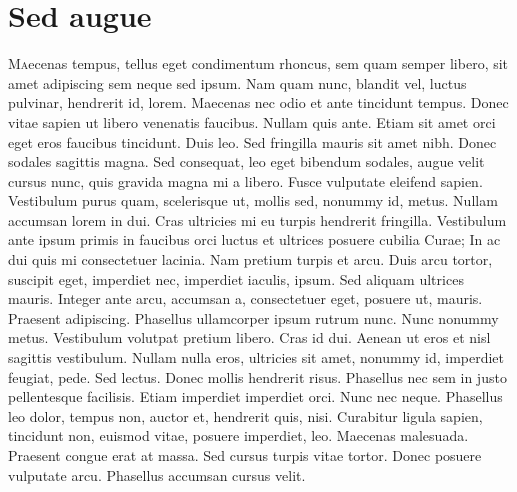 \chapter{Sed augue}
\lettrine[nindent=0em,lines=3]{M} aecenas tempus, tellus eget condimentum rhoncus, sem quam semper libero, sit amet adipiscing sem neque sed ipsum. Nam quam nunc, blandit vel, luctus pulvinar, hendrerit id, lorem. Maecenas nec odio et ante tincidunt tempus. Donec vitae sapien ut libero venenatis faucibus. Nullam quis ante. Etiam sit amet orci eget eros faucibus tincidunt. Duis leo. Sed fringilla mauris sit amet nibh. Donec sodales sagittis magna. Sed consequat, leo eget bibendum sodales, augue velit cursus nunc, quis gravida magna mi a libero. Fusce vulputate eleifend sapien. Vestibulum purus quam, scelerisque ut, mollis sed, nonummy id, metus. Nullam accumsan lorem in dui. Cras ultricies mi eu turpis hendrerit fringilla. Vestibulum ante ipsum primis in faucibus orci luctus et ultrices posuere cubilia Curae; In ac dui quis mi consectetuer lacinia. Nam pretium turpis et arcu. Duis arcu tortor, suscipit eget, imperdiet nec, imperdiet iaculis, ipsum. Sed aliquam ultrices mauris. Integer ante arcu, accumsan a, consectetuer eget, posuere ut, mauris. Praesent adipiscing. Phasellus ullamcorper ipsum rutrum nunc. Nunc nonummy metus. Vestibulum volutpat pretium libero. Cras id dui. Aenean ut eros et nisl sagittis vestibulum. Nullam nulla eros, ultricies sit amet, nonummy id, imperdiet feugiat, pede. Sed lectus. Donec mollis hendrerit risus. Phasellus nec sem in justo pellentesque facilisis. Etiam imperdiet imperdiet orci. Nunc nec neque. Phasellus leo dolor, tempus non, auctor et, hendrerit quis, nisi. Curabitur ligula sapien, tincidunt non, euismod vitae, posuere imperdiet, leo. Maecenas malesuada. Praesent congue erat at massa. Sed cursus turpis vitae tortor. Donec posuere vulputate arcu. Phasellus accumsan cursus velit.

